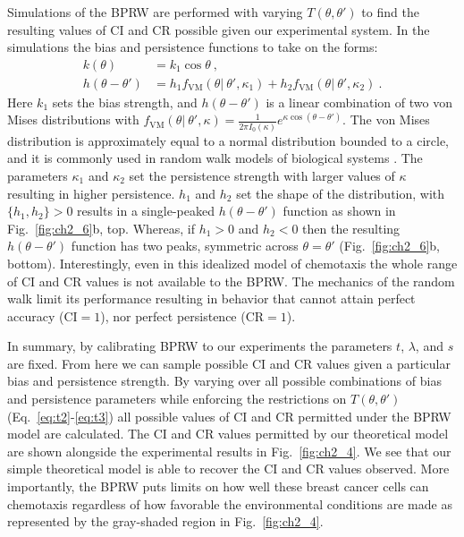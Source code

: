 Simulations of the BPRW are performed with varying $T(\theta,\theta')$ to find the resulting values of CI and CR possible given our experimental system. In the simulations the bias and persistence functions to take on the forms:
\begin{align}
    k(\theta) &= k_1 \cos\theta \ , \\
    h(\theta-\theta') &= h_1 f_\text{VM}(\theta | \ \theta', \kappa_1) + h_2 f_\text{VM}(\theta | \ \theta', \kappa_2) \ .
\end{align}
Here $k_1$ sets the bias strength, and $h(\theta-\theta')$ is a linear combination of two von Mises distributions with
$f_\text{VM}(\theta | \ \theta', \kappa) = \frac{1}{2\pi I_0(\kappa)} e^{\kappa \cos(\theta-\theta')}$.
The von Mises distribution is approximately equal to a normal distribution bounded to a circle, and it is commonly used in random walk models of biological systems \cite{codling2008random}.
The parameters $\kappa_1$ and $\kappa_2$ set the persistence strength with larger values of $\kappa$ resulting in higher persistence. $h_1$ and $h_2$ set the shape of the distribution, with $\{h_1,h_2\} > 0$ results in a single-peaked $h(\theta-\theta')$ function as shown in Fig.\ \ref{fig:ch2_6}b, top. Whereas, if $h_1> 0$ and $h_2<0$ then the resulting $h(\theta-\theta')$ function has two peaks, symmetric across $\theta=\theta'$ (Fig.\ \ref{fig:ch2_6}b, bottom).
Interestingly, even in this idealized model of chemotaxis the whole range of CI and CR values is not available to the BPRW. The mechanics of the random walk limit its performance resulting in behavior that cannot attain perfect accuracy ($\text{CI}=1$), nor perfect persistence ($\text{CR}=1$).

In summary, by calibrating BPRW to our experiments the parameters $t$, $\lambda$, and $s$ are fixed. From here we can sample possible CI and CR values given a particular bias and persistence strength. By varying over all possible combinations of bias and persistence parameters while enforcing the restrictions on $T(\theta,\theta')$ (Eq.\ \ref{eq:t2}-\ref{eq:t3}) all possible values of CI and CR permitted under the BPRW model are calculated. The CI and CR values permitted by our theoretical model are shown alongside the experimental results in  Fig.\ \ref{fig:ch2_4}. We see that our simple theoretical model is able to recover the CI and CR values observed. More importantly, the BPRW puts limits on how well these breast cancer cells can chemotaxis regardless of how favorable the environmental conditions are made as represented by the gray-shaded region in Fig.\ \ref{fig:ch2_4}.

